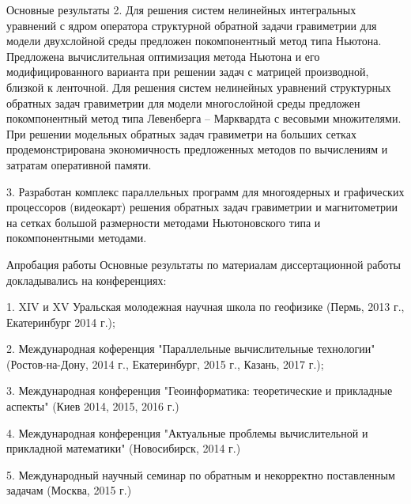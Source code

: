 \documentclass[10pt,pdf, mathserif, hyperref={unicode}]{beamer}
\begin{document}
\begin{frame}{Основные результаты}
	2. Для решения систем нелинейных интегральных уравнений с 
	ядром оператора структурной обратной задачи гравиметрии для 
	модели двухслойной среды предложен покомпонентный метод 
	типа Ньютона. Предложена вычислительная оптимизация метода 
	Ньютона и его модифицированного варианта при решении задач 
	с матрицей производной, близкой к ленточной. Для решения систем 
	нелинейных уравнений структурных обратных задач гравиметрии 
	для модели многослойной среды предложен покомпонентный
	метод типа Левенберга – Марквардта с весовыми множителями.
	При решении модельных обратных задач гравиметри на больших 
	сетках продемонстрирована экономичность предложенных методов
	по вычислениям и затратам оперативной памяти.
	
	3. Разработан комплекс параллельных программ для многоядерных и графических процессоров (видеокарт) решения обратных задач гравиметрии и магнитометрии на сетках большой размерности методами Ньютоновского типа и покомпонентными методами. 
\end{frame}
	
\begin{frame}{Апробация работы}
	Основные результаты по материалам диссертационной работы докладывались на конференциях:
	
	
	1. XIV и XV Уральская молодежная научная школа по геофизике (Пермь, 2013 г., Екатеринбург 2014 г.);
	
	2. Международная коференция "Параллельные вычислительные технологии" (Ростов-на-Дону, 2014 г., Екатеринбург, 2015 г., Казань, 2017 г.);
	
	3. Международная конференция "Геоинформатика: теоретические и прикладные аспекты" (Киев 2014, 2015, 2016 г.)
	
	4. Международная конференция "Актуальные проблемы вычислительной и прикладной математики" (Новосибирск, 2014 г.)
	
	5. Международный научный семинар по обратным и некорректно поставленным задачам (Москва, 2015 г.)
\end{frame}
\end{document}
